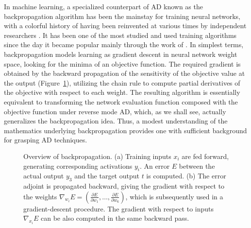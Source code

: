 \documentclass[twoside,11pt]{article}
\begin{document}
In machine learning, a specialized counterpart of AD known as the backpropagation algorithm has been the mainstay for training neural networks, with a colorful history of having been reinvented at various times by independent researchers \citep{Griewank2012,schmidhuber2015deep}. It has been one of the most studied and used training algorithms since the day it became popular mainly through the work of \citet{rumelhart1986learning}. In simplest terms, backpropagation models learning as gradient descent in neural network weight space, looking for the minima of an objective function. The required gradient is obtained by the backward propagation of the sensitivity of the objective value at the output (Figure~\ref{FigureBackpropagation}), utilizing the chain rule to compute partial derivatives of the objective with respect to each weight. The resulting algorithm is essentially equivalent to transforming the network evaluation function composed with the objective function under reverse mode AD, which, as we shall see, actually generalizes the backpropagation idea. Thus, a modest understanding of the mathematics underlying backpropagation provides one with sufficient background for grasping AD techniques.

\begin{figure}
  \centering
  \caption{Overview of backpropagation. (a) Training inputs $x_i$ are fed forward, generating corresponding activations $y_i$. An error $E$ between the actual output $y_3$ and the target output $t$ is computed. (b) The error adjoint is propagated backward, giving the gradient with respect to the weights $\nabla_{w_i}E = \left(\frac{\partial E}{\partial w_1},\dots,\frac{\partial E}{\partial w_6}\right)$, which is subsequently used in a gradient-descent procedure. The gradient with respect to inputs $\nabla_{x_i}E$ can be also computed in the same backward pass.}
  \label{FigureBackpropagation}
\end{figure}
\end{document}
